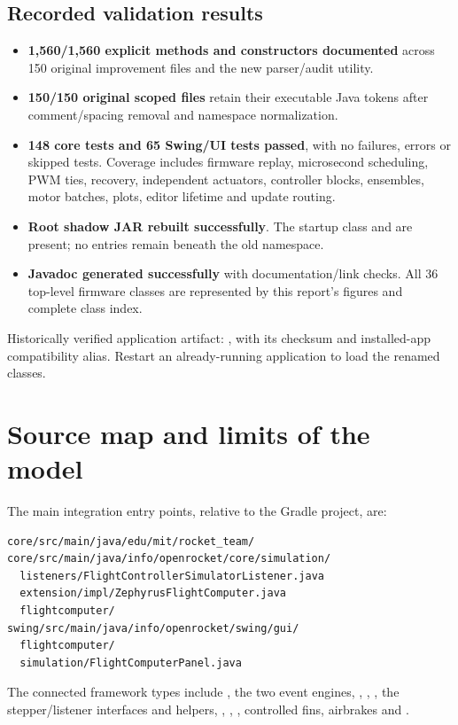 \subsection{Recorded validation results}
\begin{itemize}
\item \textbf{1,560/1,560 explicit methods and constructors documented} across
150 original improvement files and the new parser/audit utility.
\item \textbf{150/150 original scoped files} retain their executable Java
tokens after comment/spacing removal and namespace normalization.
\item \textbf{148 core tests and 65 Swing/UI tests passed}, with no failures,
errors or skipped tests. Coverage includes firmware replay, microsecond
scheduling, PWM ties, recovery, independent actuators, controller blocks,
ensembles, motor batches, plots, editor lifetime and update routing.
\item \textbf{Root shadow JAR rebuilt successfully}. The startup class and
 are present; no entries remain beneath
the old namespace.
\item \textbf{Javadoc generated successfully} with documentation/link checks.
All 36 top-level firmware classes are represented by this report's figures
and complete class index.
\end{itemize}

Historically verified application artifact: , with its
checksum and installed-app compatibility alias. Restart an already-running
application to load the renamed classes.

\clearpage
\section{Source map and limits of the model}
The main integration entry points, relative to the Gradle project, are:
\begin{lstlisting}
core/src/main/java/edu/mit/rocket_team/
core/src/main/java/info/openrocket/core/simulation/
  listeners/FlightControllerSimulatorListener.java
  extension/impl/ZephyrusFlightComputer.java
  flightcomputer/
swing/src/main/java/info/openrocket/swing/gui/
  flightcomputer/
  simulation/FlightComputerPanel.java
\end{lstlisting}
The connected framework types include , the two event
engines, , ,
, the stepper/listener interfaces and helpers,
, , , controlled
fins, airbrakes and .

